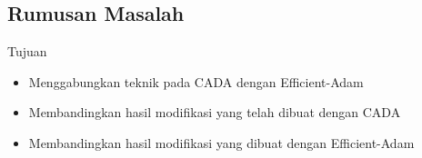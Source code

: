 \subsection{Rumusan Masalah}
\begin{frame}{Tujuan}
  \begin{itemize}
    \item Menggabungkan teknik pada CADA dengan Efficient-Adam
    \item Membandingkan hasil modifikasi yang telah dibuat dengan CADA
    \item Membandingkan hasil modifikasi yang dibuat dengan Efficient-Adam
  \end{itemize}
\end{frame}
